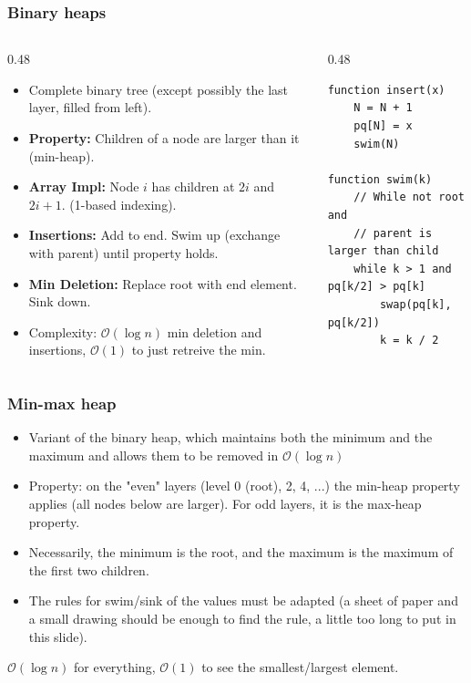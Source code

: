 \documentclass[8pt,aspectratio=169]{beamer}
\begin{document}
\begin{frame}[fragile]
\frametitle{Binary heaps}
\begin{columns}[T]
    \begin{column}{0.48\textwidth}
        \begin{itemize}
            \item Complete binary tree (except possibly the last layer, filled from left).
            \item \textbf{Property:} Children of a node are larger than it (min-heap).
            \item \textbf{Array Impl:} Node $i$ has children at $2i$ and $2i+1$. (1-based indexing).
            \item \textbf{Insertions:} Add to end. Swim up (exchange with parent) until property holds.
            \item \textbf{Min Deletion:} Replace root with end element. Sink down.
            \item Complexity: $\mathcal{O}(\log n)$ min deletion and insertions, $\mathcal{O}(1)$ to just retreive the min.
        \end{itemize}
        \vspace{1em}
    \end{column}

    \begin{column}{0.48\textwidth}
    \begin{lstlisting}[basicstyle=\tiny\ttfamily, frame=single]
function insert(x)
    N = N + 1
    pq[N] = x
    swim(N)

function swim(k)
    // While not root and 
    // parent is larger than child
    while k > 1 and pq[k/2] > pq[k]
        swap(pq[k], pq[k/2])
        k = k / 2
    \end{lstlisting}
    \end{column}
\end{columns}
\end{frame}

\begin{frame}
\frametitle{Min-max heap}
\begin{itemize}
	\item Variant of the binary heap, which maintains both the minimum and the maximum and allows them to be removed in $\mathcal{O}(\log n)$
	\item Property: on the "even" layers (level 0 (root), 2, 4, ...) the min-heap property applies (all nodes below are larger). For odd layers, it is the max-heap property.
	\item Necessarily, the minimum is the root, and the maximum is the maximum of the first two children.
	\item The rules for swim/sink of the values must be adapted (a sheet of paper and a small drawing should be enough to find the rule, a little too long to put in this slide).
\end{itemize}
$\mathcal{O}(\log n)$ for everything, $\mathcal{O}(1)$ to see the smallest/largest element.
\end{frame}
\end{document}
